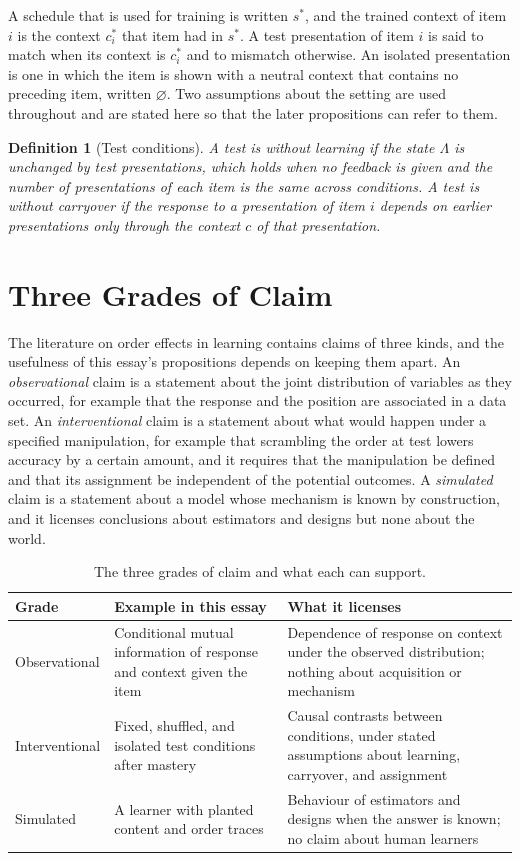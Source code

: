 \documentclass[11pt]{article}
\newtheorem{definition}{Definition}
\theoremstyle{remark}
\begin{document}
A schedule that is used for training is written $s^\ast$, and the trained context of item $i$ is the context $c^\ast_i$ that item had in $s^\ast$. A test presentation of item $i$ is said to match when its context is $c^\ast_i$ and to mismatch otherwise. An isolated presentation is one in which the item is shown with a neutral context that contains no preceding item, written $\varnothing$. Two assumptions about the setting are used throughout and are stated here so that the later propositions can refer to them.

\begin{definition}[Test conditions]
A test is \emph{without learning} if the state $\Lambda$ is unchanged by test presentations, which holds when no feedback is given and the number of presentations of each item is the same across conditions. A test is \emph{without carryover} if the response to a presentation of item $i$ depends on earlier presentations only through the context $c$ of that presentation.
\end{definition}

\section{Three Grades of Claim}

The literature on order effects in learning contains claims of three kinds, and the usefulness of this essay's propositions depends on keeping them apart. An \emph{observational} claim is a statement about the joint distribution of variables as they occurred, for example that the response and the position are associated in a data set. An \emph{interventional} claim is a statement about what would happen under a specified manipulation, for example that scrambling the order at test lowers accuracy by a certain amount, and it requires that the manipulation be defined and that its assignment be independent of the potential outcomes. A \emph{simulated} claim is a statement about a model whose mechanism is known by construction, and it licenses conclusions about estimators and designs but none about the world.

\begin{table}[ht]
\centering
\small
\begin{tabular}{p{2.4cm}p{4.2cm}p{4.9cm}}
\toprule
Grade & Example in this essay & What it licenses \\
\midrule
Observational & Conditional mutual information of response and context given the item & Dependence of response on context under the observed distribution; nothing about acquisition or mechanism \\
Interventional & Fixed, shuffled, and isolated test conditions after mastery & Causal contrasts between conditions, under stated assumptions about learning, carryover, and assignment \\
Simulated & A learner with planted content and order traces & Behaviour of estimators and designs when the answer is known; no claim about human learners \\
\bottomrule
\end{tabular}
\caption{The three grades of claim and what each can support.}
\end{table}
\end{document}
